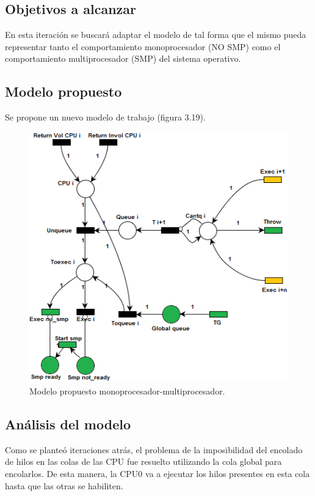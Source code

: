\documentclass[a4paper]{book}
\begin{document}
\subsection{Objetivos a alcanzar}
En esta iteraci\'on se buscar\'a adaptar el modelo de tal forma que el mismo pueda representar tanto el comportamiento monoprocesador (NO SMP) como el comportamiento multiprocesador (SMP) del sistema operativo.

\subsection{Modelo propuesto}
Se propone un nuevo modelo de trabajo (figura 3.19).

\begin{figure} [H]
	\begin{center}
	    \includegraphics[scale=0.95]{./imagenes/it10modelored.png}
		\caption{Modelo propuesto monoprocesador-multiprocesador.}
	\end{center}
\end{figure}

\subsection{An\'alisis del modelo}
Como se plante\'o iteraciones atr\'as, el problema de la imposibilidad del encolado de hilos en las colas de las CPU fue resuelto utilizando la cola global para encolarlos. De esta manera, la CPU0 va a ejecutar los hilos presentes en esta cola hasta que las otras se habiliten.\\
\end{document}
